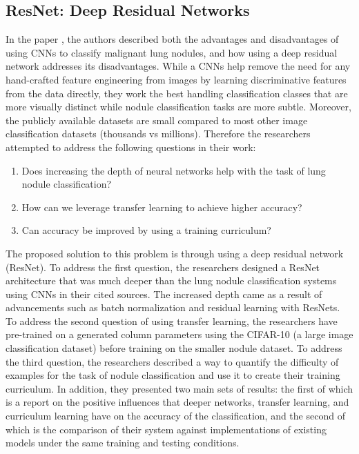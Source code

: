 \documentclass[10pt,twocolumn,letterpaper]{article}
\begin{document}
   \subsection{ResNet: Deep Residual Networks} \label{sec:related-deep-residual-networks}
      In the paper \cite{deep_residual_network}, the authors described both the advantages and disadvantages of using
      CNNs to classify malignant lung nodules, and how using a deep residual network addresses its disadvantages.
      While a CNNs help remove the need for any hand-crafted feature engineering from images by learning discriminative
      features from the data directly, they work the best handling classification classes that are more visually distinct
      while nodule classification tasks are more subtle. Moreover, the publicly available datasets are small compared to
      most other image classification datasets (thousands vs millions). Therefore the researchers attempted to address
      the following questions in their work:

      \begin{enumerate}
	     \item Does increasing the depth of neural networks help with the task of lung nodule classification?
	     \item How can we leverage transfer learning to achieve higher accuracy?
	     \item Can accuracy be improved by using a training curriculum?
      \end{enumerate}

      The proposed solution to this problem is through using a deep residual network (ResNet). To address the first question,
      the researchers designed a ResNet architecture that was much deeper than the lung nodule classification systems
      using CNNs in their cited sources. The increased depth came as a result of advancements such as batch normalization
      and residual learning with ResNets. To address the second question of using transfer learning, the researchers
      have pre-trained on a generated column parameters using the CIFAR-10 (a large image classification dataset) before
      training on the smaller nodule dataset. To address the third question, the researchers described a way to quantify the
      difficulty of examples for the task of nodule classification and use it to create their training curriculum. In addition,
      they presented two main sets of results: the first of which is a report on the positive influences that deeper networks, transfer learning, and curriculum
      learning have on the accuracy of the classification, and the second of which is the comparison of their system
      against implementations of existing models under the same training and testing conditions.
\end{document}
